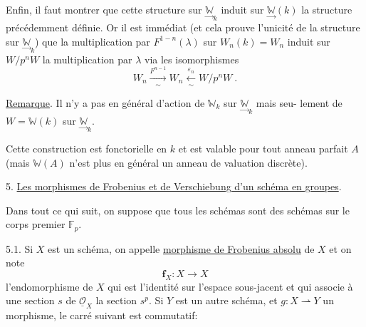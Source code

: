 Enfin, il faut montrer que cette structure sur $\underset{\to}{\mathbb{W}}_k$ induit
sur $\underset{\to}{\mathbb{W}}(k)$ la structure précédemment définie. Or il est immédiat
(et cela prouve l'unicité de la structure sur $\underset{\to}{\mathbb{W}}_k$) que la multiplication
par $F^{1-n}(\lambda)$ sur $W_n(k) = W_n$ induit sur $W/p^nW$ la multiplication par
$\lambda$ via les isomorphismes
\[ W_n \xrightarrow[\sim]{F^{n-1}} W_n \xleftarrow[\sim]{\varepsilon_n} W/p^nW \ . \]

\uline{Remarque}. Il n'y a pas en général d'action de $\mathbb{W}_k$ sur $\underset{\to}{\mathbb{W}}_k$ mais seu-%
lement de $W = \mathbb{W}(k)$ sur $\underset{\to}{\mathbb{W}}_k$.

Cette construction est fonctorielle en $k$ et est valable pour
tout anneau parfait $A$ (mais $\mathbb{W}(A)$ n'est plus en général un anneau de
valuation discrète).

5. \uline{Les morphismes de Frobenius et de Verschiebung d'un schéma en groupes}.

Dans tout ce qui suit, on suppose que tous les schémas sont des
schémas sur le corps premier $\mathbb{F}_p$.

5.1. Si $X$ est un schéma, on appelle \uline{morphisme de Frobenius absolu}
de $X$ et on note
\[ \mathbf{f}_X : X \to X \]
l'endomorphisme de $X$ qui est l'identité sur l'espace sous-jacent et
qui associe à une section $s$ de $\underline{\mathcal{O}}_X$ la section $s^p$. Si $Y$ est un
autre schéma, et $g: X \rightharpoonup Y$ un morphisme, le carré suivant est commutatif:

